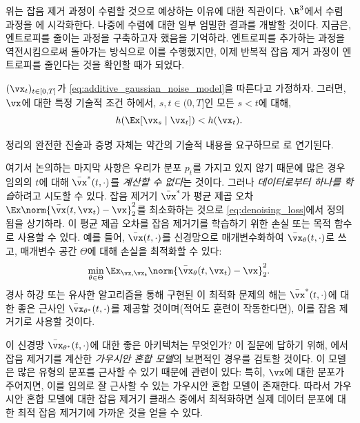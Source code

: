 \documentclass[../../book-main_ko.tex]{subfiles}
\begin{document}
위는 잡음 제거 과정이 수렴할 것으로 예상하는 이유에 대한 직관이다. \(\R^{3}\)에서 수렴 과정을 에 시각화한다. 나중에 수렴에 대한 일부 엄밀한 결과를 개발할 것이다. 지금은, 엔트로피를 줄이는 과정을 구축하고자 했음을 기억하라. 엔트로피를 추가하는 과정을 역전시킴으로써 돌아가는 방식으로 이를 수행했지만, 이제 반복적 잡음 제거 과정이 엔트로피를 줄인다는 것을 확인할 때가 되었다.

\begin{theorem}
	\((\vx_{t})_{t \in [0, T]}\)가 \eqref{eq:additive_gaussian_noise_model}을 따른다고 가정하자. 그러면, \(\vx\)에 대한 특정 기술적 조건 하에서, \(s, t \in (0, T]\)인 모든 \(s < t\)에 대해,
	\begin{equation}
		h(\Ex[\vx_{s} \mid \vx_{t}]) < h(\vx_{t}).
	\end{equation}
\end{theorem}
정리의 완전한 진술과 증명 자체는 약간의 기술적 내용을 요구하므로 로 연기된다.

여기서 논의하는 마지막 사항은 우리가 분포 \(p_{t}\)를 가지고 있지 않기 때문에 많은 경우 임의의 \(t\)에 대해 \(\bar{\vx}^{\ast}(t, \cdot)\)를 \textit{계산할 수 없다}는 것이다. 그러나 \textit{데이터로부터 하나를 학습}하려고 시도할 수 있다. 잡음 제거기 \(\bar{\vx}^{\ast}\)가 평균 제곱 오차 \(\Ex\norm{\bar{\vx}(t, \vx_{t}) - \vx}_{2}^{2}\)를 최소화하는 것으로 \eqref{eq:denoising_loss}에서 정의됨을 상기하라. 이 평균 제곱 오차를 잡음 제거기를 학습하기 위한 손실 또는 목적 함수로 사용할 수 있다. 예를 들어, \(\bar{\vx}(t, \cdot)\)를 신경망으로 매개변수화하여 \(\bar{\vx}_{\theta}(t, \cdot)\)로 쓰고, 매개변수 공간 \(\Theta\)에 대해 손실을 최적화할 수 있다:
\begin{equation}
	\min_{\theta \in \Theta}\Ex_{\vx, \vx_{t}}\norm{\bar{\vx}_{\theta}(t, \vx_{t}) - \vx}_{2}^{2}.
\end{equation}
경사 하강 또는 유사한 알고리즘을 통해 구현된 이 최적화 문제의 해는 \(\bar{\vx}^{\ast}(t, \cdot)\)에 대한 좋은 근사인 \(\bar{\vx}_{\theta^{\ast}}(t, \cdot)\)를 제공할 것이며(적어도 훈련이 작동한다면), 이를 잡음 제거기로 사용할 것이다.

이 신경망 \(\bar{\vx}_{\theta^{\ast}}(t, \cdot)\)에 대한 좋은 아키텍처는 무엇인가? 이 질문에 답하기 위해, 에서 잡음 제거기를 계산한 \textit{가우시안 혼합 모델}의 보편적인 경우를 검토할 것이다. 이 모델은 많은 유형의 분포를 근사할 수 있기 때문에 관련이 있다: 특히, \(\vx\)에 대한 분포가 주어지면, 이를 임의로 잘 근사할 수 있는 가우시안 혼합 모델이 존재한다. 따라서 가우시안 혼합 모델에 대한 잡음 제거기 클래스 중에서 최적화하면 실제 데이터 분포에 대한 최적 잡음 제거기에 가까운 것을 얻을 수 있다.
\end{document}
